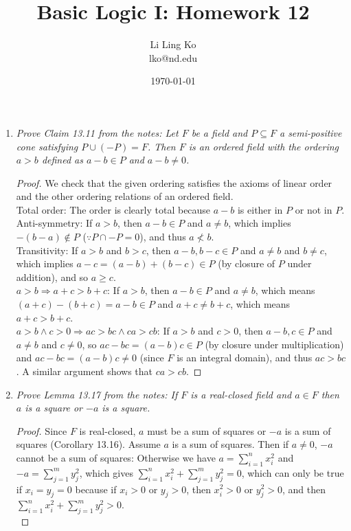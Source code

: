 \documentclass{article}
\begin{document}
\title{Basic Logic I: Homework 12}
\author{Li Ling Ko\\ lko@nd.edu}
\date{\today}
\maketitle

\begin{enumerate}[label={\bf Q\arabic*:}]
  \item \it Prove Claim 13.11 from the notes: Let $F$ be a field and
    $P\subseteq F$ a semi-positive cone satisfying $P\cup(-P)=F$. Then $F$
    is an ordered field with the ordering $a>b$ defined as $a-b\in P$ and
    $a-b\neq0$. 

    \begin{proof}
      We check that the given ordering satisfies the axioms of linear
      order and the other ordering relations of an ordered field. \\

      Total order: The order is clearly total because $a-b$ is either in
      $P$ or not in $P$. \\

      Anti-symmetry: If $a>b$, then $a-b\in P$ and $a\neq b$, which implies
      $-(b-a)\notin P$ ($\because P\cap -P=0$), and thus $a\not<b$. \\

      Transitivity: If $a>b$ and $b>c$, then $a-b,b-c\in P$ and $a\neq b$
      and $b\neq c$, which implies $a-c=(a-b)+(b-c)\in P$ (by closure of
      $P$ under addition), and so $a\geq c$. \\

      $a>b\Rightarrow a+c>b+c$: If $a>b$, then $a-b\in P$ and $a\neq b$,
      which means $(a+c)-(b+c)=a-b\in P$ and $a+c\neq b+c$, which means
      $a+c>b+c$. \\

      $a>b\wedge c>0\Rightarrow ac>bc\wedge ca>cb$: If $a>b$ and $c>0$,
      then $a-b,c\in P$ and $a\neq b$ and $c\neq0$, so $ac-bc=(a-b)c\in P$
      (by closure under multiplication) and $ac-bc=(a-b)c\neq0$ (since $F$
      is an integral domain), and thus $ac>bc$. A similar argument shows
      that $ca>cb$.
    \end{proof}

  \item \it Prove Lemma 13.17 from the notes: If $F$ is a real-closed field
    and $a\in F$ then $a$ is a square or $-a$ is a square.

    \begin{proof}
      Since $F$ is real-closed, $a$ must be a sum of squares or $-a$
      is a sum of squares (Corollary 13.16). Assume $a$ is a sum of squares.
      Then if $a\neq0$, $-a$ cannot be a sum of squares: Otherwise
      we have $a=\sum_{i=1}^n x_i^2$ and $-a=\sum_{j=1}^m y_j^2$, which
      gives $\sum_{i=1}^n x_i^2+ \sum_{j=1}^m y_j^2=0$, which can only be
      true if $x_i=y_j=0$ because if $x_i>0$ or $y_j>0$, then $x_i^2>0$ or
      $y_j^2>0$, and then $\sum_{i=1}^n x_i^2+ \sum_{j=1}^m y_j^2>0$. \\


\end{proof}
\end{enumerate}
\end{document}
